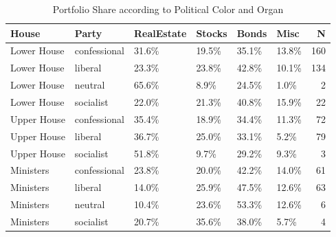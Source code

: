 \begin{table}[ht]
\centering
\begingroup\small
\begin{tabular}{llllllr}
  \hline
House & Party & RealEstate & Stocks & Bonds & Misc & N \\ 
  \hline
Lower House & confessional & 31.6\% & 19.5\% & 35.1\% & 13.8\% & 160 \\ 
  Lower House & liberal & 23.3\% & 23.8\% & 42.8\% & 10.1\% & 134 \\ 
  Lower House & neutral & 65.6\% & 8.9\% & 24.5\% & 1.0\% &   2 \\ 
  Lower House & socialist & 22.0\% & 21.3\% & 40.8\% & 15.9\% &  22 \\ 
  Upper House & confessional & 35.4\% & 18.9\% & 34.4\% & 11.3\% &  72 \\ 
  Upper House & liberal & 36.7\% & 25.0\% & 33.1\% & 5.2\% &  79 \\ 
  Upper House & socialist & 51.8\% & 9.7\% & 29.2\% & 9.3\% &   3 \\ 
  Ministers & confessional & 23.8\% & 20.0\% & 42.2\% & 14.0\% &  61 \\ 
  Ministers & liberal & 14.0\% & 25.9\% & 47.5\% & 12.6\% &  63 \\ 
  Ministers & neutral & 10.4\% & 23.6\% & 53.3\% & 12.6\% &   6 \\ 
  Ministers & socialist & 20.7\% & 35.6\% & 38.0\% & 5.7\% &   4 \\ 
   \hline
\end{tabular}
\endgroup
\caption{Portfolio Share according to Political Color and Organ} 
\label{fig:portcomp2}
\end{table}
